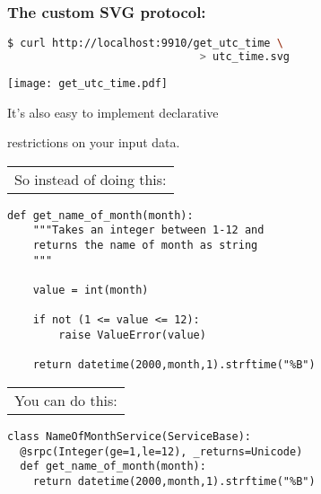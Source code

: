\documentclass{beamer}
\begin{document}
\begin{frame}[fragile]
\frametitle{The custom SVG protocol:}

  \begin{lstlisting}[language=sh]
$ curl http://localhost:9910/get_utc_time \
                              > utc_time.svg
  \end{lstlisting}

  \begin{center}
    \texttt{[image: get\_utc\_time.pdf]}
  \end{center}
\end{frame}

\begin{frame}

  \begin{center}
  \LARGE
    It's also easy to implement declarative

    \bigskip

    restrictions on your input data.
  \end{center}

\end{frame}

\begin{frame}[fragile]
  \begin{tabular}{l}
  \LARGE So instead of doing this:
  \end{tabular}

  \bigskip

  \begin{lstlisting}
def get_name_of_month(month):
    """Takes an integer between 1-12 and
    returns the name of month as string
    """

    value = int(month)

    if not (1 <= value <= 12):
        raise ValueError(value)

    return datetime(2000,month,1).strftime("%B")
  \end{lstlisting}
\end{frame}

\begin{frame}[fragile]
  \begin{tabular}{l}
  \LARGE You can do this:
  \end{tabular}

  \bigskip

  \begin{lstlisting}[emph={Integer,le,ge}]
class NameOfMonthService(ServiceBase):
  @srpc(Integer(ge=1,le=12), _returns=Unicode)
  def get_name_of_month(month):
    return datetime(2000,month,1).strftime("%B")
  \end{lstlisting}
\end{frame}
\end{document}
